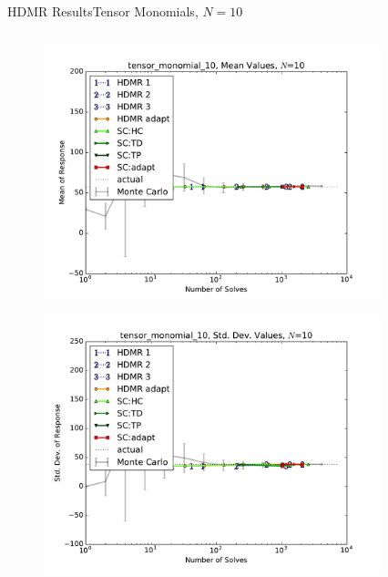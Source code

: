 \documentclass{beamer}
\begin{document}
\begin{frame}{HDMR Results}{Tensor Monomials, $N=10$}\vspace{-20pt}
 \begin{columns}
   \begin{column}{0.5\textwidth}
        \begin{figure}[h!]
          \centering
          \includegraphics[width=0.8\linewidth]{anlmodels/tensor_monomial_10_mean_vals}
        \end{figure}
        \vspace{-20pt}
        \begin{figure}[h!]
          \centering
          \includegraphics[width=0.8\linewidth]{anlmodels/tensor_monomial_10_var_vals}
        \end{figure}
   \end{column}
   \begin{column}{0.5\textwidth}
        \begin{figure}[h!]
          \centering

\end{figure}
\end{column}
\end{columns}
\end{frame}
\end{document}
